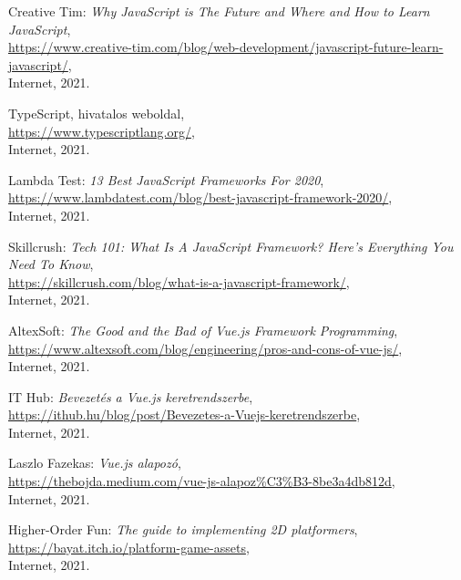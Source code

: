 \begin{thebibliography}{x}
	Creative Tim: \emph{Why JavaScript is The Future and Where and How to Learn JavaScript}, \\
	\url{https://www.creative-tim.com/blog/web-development/javascript-future-learn-javascript/}, \\
	Internet, 2021.
	
	TypeScript, hivatalos weboldal, \\
	\url{https://www.typescriptlang.org/}, \\
	Internet, 2021.
	
	Lambda Test: \emph{13 Best JavaScript Frameworks For 2020}, \\
	\url{https://www.lambdatest.com/blog/best-javascript-framework-2020/}, \\
	Internet, 2021.
	
	Skillcrush: \emph{Tech 101: What Is A JavaScript Framework? Here’s Everything You Need To Know}, \\
	\url{https://skillcrush.com/blog/what-is-a-javascript-framework/}, \\
	Internet, 2021.
	
	AltexSoft: \emph{The Good and the Bad of Vue.js Framework Programming}, \\
	\url{https://www.altexsoft.com/blog/engineering/pros-and-cons-of-vue-js/}, \\
	Internet, 2021.
	
	IT Hub: \emph{Bevezetés a Vue.js keretrendszerbe}, \\
	\url{https://ithub.hu/blog/post/Bevezetes-a-Vuejs-keretrendszerbe}, \\
	Internet, 2021.
	
	Laszlo Fazekas: \emph{Vue.js alapozó}, \\
	\url{https://thebojda.medium.com/vue-js-alapoz\%C3\%B3-8be3a4db812d}, \\
	Internet, 2021.
	
	Higher-Order Fun: \emph{The guide to implementing 2D platformers}, \\
	\url{https://bayat.itch.io/platform-game-assets}, \\
	Internet, 2021.
	

\end{thebibliography}
